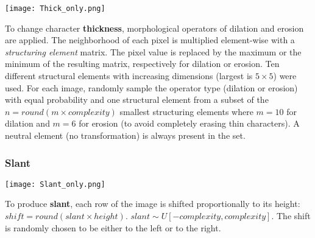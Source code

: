 \documentclass{article} %
\begin{document}
\begin{minipage}[b]{0.14\linewidth}
\begin{center}
\vspace*{-5mm}
\texttt{[image: Thick\_only.png]}\\
\end{center}
\vspace{.6cm}
\end{minipage}%
\hspace{0.3cm}\begin{minipage}[b]{0.86\linewidth}
To change character {\bf thickness}, morphological operators of dilation and erosion~\citep{Haralick87,Serra82}
are applied. The neighborhood of each pixel is multiplied
element-wise with a {\em structuring element} matrix.
The pixel value is replaced by the maximum or the minimum of the resulting
matrix, respectively for dilation or erosion. Ten different structural elements with 
increasing dimensions (largest is $5\times5$) were used.  For each image, 
randomly sample the operator type (dilation or erosion) with equal probability and one structural
element from a subset of the $n=round(m \times complexity)$ smallest structuring elements
where $m=10$ for dilation and $m=6$ for erosion (to avoid completely erasing thin characters).  
A neutral element (no transformation) 
is always present in the set.
\end{minipage}

\vspace{2mm}

\subsubsection*{Slant}
\vspace*{2mm}

\begin{minipage}[b]{0.14\linewidth}
\centering
\texttt{[image: Slant\_only.png]}\\
\end{minipage}%
\hspace{0.3cm}
\begin{minipage}[b]{0.83\linewidth}
To produce {\bf slant}, each row of the image is shifted
proportionally to its height: $shift = round(slant \times height)$.  
$slant \sim U[-complexity,complexity]$.
The shift is randomly chosen to be either to the left or to the right.
\vspace{5mm}
\end{minipage}
\end{document}
